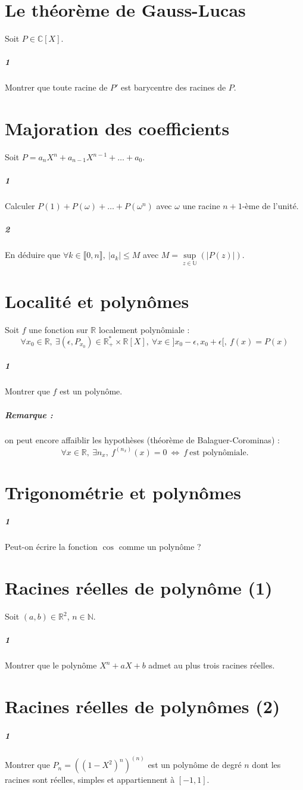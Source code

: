 \documentclass[10pt,a4paper]{article}
\begin{document}
\section{Le théorème de Gauss-Lucas}
Soit $P \in \mathbb{C}[X]$.
\subparagraph{1}Montrer que toute racine de $P'$ est barycentre des racines de $P$.
\section{Majoration des coefficients}
Soit $P=a_nX^n+a_{n-1}X^{n-1}+ \dots +a_0$.
\subparagraph{1}Calculer $P(1)+P(\omega)+\dots+P(\omega^n)$ avec $\omega$ une racine $n+1$-ème de l'unité.
\subparagraph{2}En déduire que $\forall k \in \llbracket 0,n\rrbracket, \ \vert a_k \vert \le M$ avec $M=\underset{z \in \mathbb{U}}{\sup}(\vert P(z) \vert)$.
\section{Localité et polynômes}
Soit $f$ une fonction sur $\mathbb{R}$ localement polynômiale :
\begin{equation*}
\forall x_0 \in \mathbb{R}, \ \exists (\epsilon,P_{x_0}) \in \mathbb{R}_+^* \times \mathbb{R}[X], \ \forall x \in ]x_0-\epsilon,x_0+\epsilon[, \ f(x)=P(x)
\end{equation*}
\subparagraph{1}Montrer que $f$ est un polynôme.
\subparagraph{Remarque :} on peut encore affaiblir les hypothèses (théorème de Balaguer-Corominas) :
\begin{equation*}
\forall x \in \mathbb{R}, \ \exists n_x, \ f^{(n_x)}(x)=0 \ \Leftrightarrow \ f \ \text{est polynômiale.}
\end{equation*}
\section{Trigonométrie et polynômes}
\subparagraph{1}Peut-on écrire la fonction $\cos$ comme un polynôme ?
\section{Racines réelles de polynôme (1)}
Soit $(a,b) \in \mathbb{R}^2$, $n \in \mathbb{N}$.
\subparagraph{1}Montrer que le polynôme $X^n+aX+b$ admet au plus trois racines réelles.

\section{Racines réelles de polynômes (2)}
\subparagraph{1}Montrer que $P_n=((1-X^2)^n)^{(n)}$ est un polynôme de degré $n$ dont les racines sont réelles, simples et appartiennent à $[-1,1]$.
\end{document}

